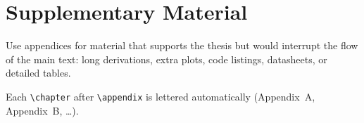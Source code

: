 \chapter{Supplementary Material}
\label{app:supplementary}

Use appendices for material that supports the thesis but would interrupt the
flow of the main text: long derivations, extra plots, code listings, datasheets,
or detailed tables.

Each \texttt{\textbackslash chapter} after \texttt{\textbackslash appendix} is
lettered automatically (Appendix~A, Appendix~B, \ldots).
